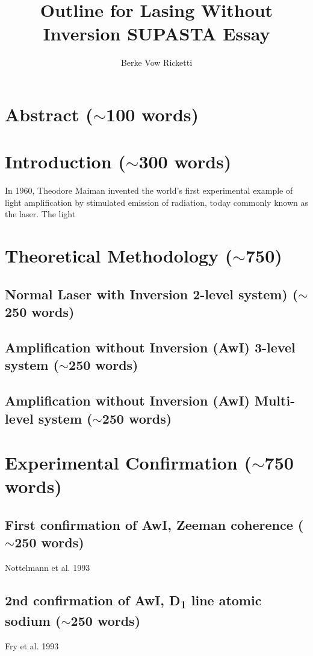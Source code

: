 \documentclass{article}
\title{Outline for Lasing Without Inversion SUPASTA Essay}
\author{Berke Vow Ricketti}
\begin{document}
\maketitle{}




\section{Abstract ($\sim$100 words)}

\section{Introduction ($\sim$300 words)}

In 1960, Theodore Maiman invented the world's first experimental example of light amplification by stimulated emission of radiation, today commonly known as the laser. The light 

\cite{Harris1989,Scully1994,Kocharovskaya1986,Mandel1993,Kilin2008,Ukhanov1999,Zhu1992,Marthaler2011,Mompart2000}
\section{Theoretical Methodology ($\sim$750)}
\subsection{Normal Laser with Inversion 2-level system) ($\sim$250 words)}
\subsection{Amplification without Inversion (AwI) 3-level system ($\sim$250 words)}
\subsection{Amplification without Inversion (AwI) Multi-level system ($\sim$250 words)}

\section{Experimental Confirmation ($\sim$750 words)}
\subsection{First confirmation of AwI, Zeeman coherence ($\sim$250 words)}
Nottelmann et al. 1993 \cite{Nottelmann1993}
\subsection{2nd confirmation of AwI, D\textsubscript{1} line atomic sodium ($\sim$250 words)}
Fry et al. 1993 \cite{PhysRevLett.70.3235}
\end{document}
